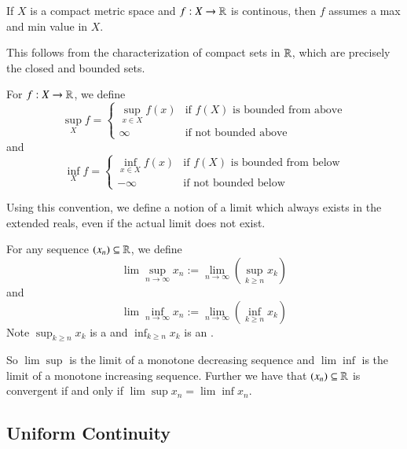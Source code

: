 \begin{prop}\label{prop:3.1.3}
    If $X$ is a compact metric space and $f:X\rightarrow \mathbb R$ is continous, then $f$ assumes a max and min value in $X$.
\end{prop}
This follows from the characterization of compact sets in $\mathbb R$, which are precisely the closed and bounded sets.

\begin{defn}
    For $f:X\rightarrow \mathbb R$, we define \begin{equation*}
        \sup_{X}f = \left\{\begin{array}{cc} \sup_{x\in X}f(x) & \text{if $f(X)$ is bounded from above} \\ \infty & \text{if not bounded above} \end{array}\right.
    \end{equation*}
    and \begin{equation*}
        \inf_{X}f = \left\{\begin{array}{cc} \inf_{x\in X}f(x) & \text{if $f(X)$ is bounded from below} \\ -\infty & \text{if not bounded below} \end{array}\right.
    \end{equation*}
\end{defn}

Using this convention, we define a notion of a limit which always exists in the extended reals, even if the actual limit does not exist.

\begin{defn}
    For any sequence $(x_n) \subseteq \mathbb R$, we define \begin{equation*}
        \lim\sup\limits_{n\rightarrow \infty}x_n := \lim\limits_{n\rightarrow \infty}\left(\sup_{k\geq n}x_k\right) 
    \end{equation*}
    and \begin{equation*}
        \lim\inf\limits_{n\rightarrow \infty}x_n := \lim\limits_{n\rightarrow \infty}\left(\inf_{k\geq n}x_k\right) 
    \end{equation*}
    Note $\sup_{k\geq n}x_k$ is a  and $\inf_{k\geq n}x_k$ is an .
\end{defn}
So $\lim\sup$ is the limit of a monotone decreasing sequence and $\lim\inf$ is the limit of a monotone increasing sequence. Further we have that $(x_n) \subseteq \mathbb R$ is convergent if and only if $\lim\sup x_n = \lim\inf x_n$.

\subsection{Uniform Continuity}


